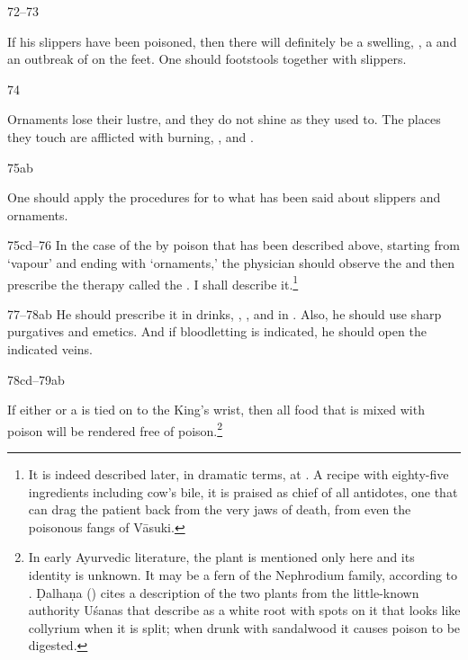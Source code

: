 \begin{translation}
\item[72--73]

If his slippers have been poisoned, then there will definitely be a
swelling, , a  and an
outbreak of  on the feet. One should  footstools together with slippers.

\item[74]

Ornaments lose their lustre, and they do not shine as they used to.
The places they touch are afflicted with  burning, 
, and .

\item[75ab]

One should apply the procedures for  to what has 
been said about slippers and ornaments.

\item[75cd--76]  In the case of the  by poison
that has been described above, starting from `vapour' and ending with 
`ornaments,'
the physician should observe the  and then prescribe
the therapy called the  
.  I
shall describe it.\footnote{It is indeed described later, in 
dramatic terms, at .  A recipe with eighty-five ingredients 
including cow's bile, it is 
praised as chief of all antidotes, one that can drag the patient back from the very 
jaws of death, from even the poisonous fangs of Vāsuki.}

\item [77--78ab] He should prescribe it in drinks, ,
, and in .  Also, he should use 
sharp
purgatives and emetics.  And if bloodletting is indicated, he should 
open the indicated veins.

\item[78cd--79ab]

If either  %
or a  %
is tied on to the King's wrist, then all food that is mixed with poison will be
rendered free of poison.\footnote{In early Ayurvedic literature, the plant
 is mentioned only here and its identity is unknown.  It may be a
fern of the Nephrodium family, according to \citet[7]{sing-1972}.  Ḍalhaṇa
() cites a description of the two plants from the little-known
authority Uśanas \citep[IA, 660 et passim]{meul-hist} that describe 
as a white root with spots on it that looks like collyrium when it is split; when
drunk with sandalwood it causes poison to be digested.} %


\end{translation}

